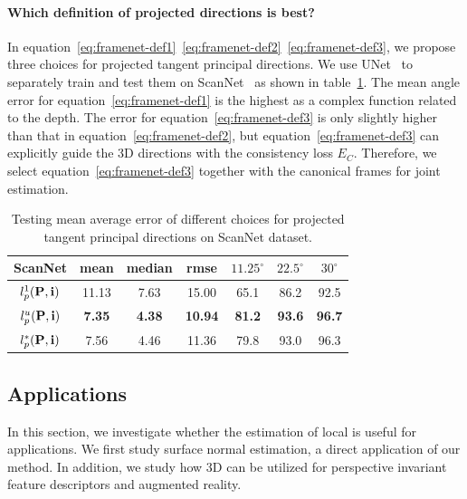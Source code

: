 \vspace{-0.1in}
\paragraph{Which definition of projected directions is best?}
In equation~\ref{eq:framenet-def1}~\ref{eq:framenet-def2}~\ref{eq:framenet-def3}, we propose three choices for projected tangent principal directions. We use UNet~\cite{ronneberger2015u} to separately train and test them on ScanNet~\cite{dai2017scannet} as shown in table~\ref{tab:framenet-def}. The mean angle error for equation~\ref{eq:framenet-def1} is the highest as a complex function related to the depth. The error for equation~\ref{eq:framenet-def3} is only slightly higher than that in equation~\ref{eq:framenet-def2}, but equation~\ref{eq:framenet-def3} can explicitly guide the 3D directions with the consistency loss $E_C$. Therefore, we select equation~\ref{eq:framenet-def3} together with the canonical frames for joint estimation.

\begin{table}[t]
    \centering
    \tabcolsep=0.13cm
    \small
    \begin{tabular}{|c|c|c|c||c|c|c|}
        \hline
         \textbf{ScanNet} & mean & median & rmse & $11.25^\circ$ & $22.5^\circ$ & $30^\circ$\\
         \hline
         $l^1_p(\mathbf{P},\mathbf{i})$ & 11.13 & 7.63 & 15.00 & 65.1 & 86.2 & 92.5\\
         \hline
         $l^u_p(\mathbf{P},\mathbf{i})$ & \textbf{7.35} & \textbf{4.38} & \textbf{10.94} & \textbf{81.2} & \textbf{93.6} & \textbf{96.7}\\
         \hline
         $l^*_p(\mathbf{P},\mathbf{i})$ & 7.56 & 4.46 & 11.36 & 79.8 & 93.0 & 96.3\\
         \hline
    \end{tabular}
    \caption{Testing mean average error of different choices for projected tangent principal directions on ScanNet dataset.}
    \label{tab:framenet-def}
\end{table}

\subsection{Applications}
\label{sec:framenet-applications}

In this section, we investigate whether the estimation of local \cframe{} is useful for applications.   We first study surface normal estimation, a direct application of our method.   In addition, we study how 3D \cframe{} can be utilized for perspective invariant feature descriptors and augmented reality.

